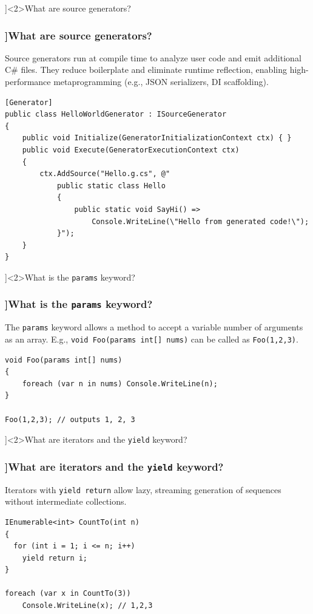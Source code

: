 \QuestionSlide[\CategoryBadge[MetaColor!20]{Metaprogramming}]<2>{What are source generators?}
\begin{frame}[fragile]
  \frametitle{\AnswerTitle[\CategoryBadge[MetaColor!20]{Metaprogramming}]{What are source generators?}}

  {\footnotesize
    Source generators run at compile time to analyze user code and emit additional C\# files. They reduce boilerplate and eliminate runtime reflection, enabling high-performance metaprogramming (e.g., JSON serializers, DI scaffolding).
  }

  \begin{verbatim}
[Generator]
public class HelloWorldGenerator : ISourceGenerator
{
    public void Initialize(GeneratorInitializationContext ctx) { }
    public void Execute(GeneratorExecutionContext ctx)
    {
        ctx.AddSource("Hello.g.cs", @"
            public static class Hello
            {
                public static void SayHi() =>
                    Console.WriteLine(\"Hello from generated code!\");
            }");
    }
}
  \end{verbatim}
\end{frame}

\QuestionSlide[\CategoryBadge[LangColor!20]{Language Feature}]<2>{What is the \texttt{params} keyword?}
\begin{frame}[fragile]
  \frametitle{\AnswerTitle[\CategoryBadge[LangColor!20]{Language Feature}]{What is the \texttt{params} keyword?}}

  {\footnotesize
    The \texttt{params} keyword allows a method to accept a variable number of arguments as an array.  
    E.g., \texttt{void Foo(params int[] nums)} can be called as \texttt{Foo(1,2,3)}.
  }

  \begin{verbatim}
void Foo(params int[] nums)
{
    foreach (var n in nums) Console.WriteLine(n);
}

Foo(1,2,3); // outputs 1, 2, 3
  \end{verbatim}
\end{frame}

\QuestionSlide[\CategoryBadge[LangColor!20]{Language Feature}]<2>{What are iterators and the \texttt{yield} keyword?}
\begin{frame}[fragile]
  \frametitle{\AnswerTitle[\CategoryBadge[LangColor!20]{Language Feature}]{What are iterators and the \texttt{yield} keyword?}}

  {\footnotesize
    Iterators with \texttt{yield return} allow lazy, streaming generation of sequences without intermediate collections.
  }

  \begin{verbatim}
IEnumerable<int> CountTo(int n)
{
  for (int i = 1; i <= n; i++)
    yield return i;
}

foreach (var x in CountTo(3))
    Console.WriteLine(x); // 1,2,3
  \end{verbatim}
\end{frame}

